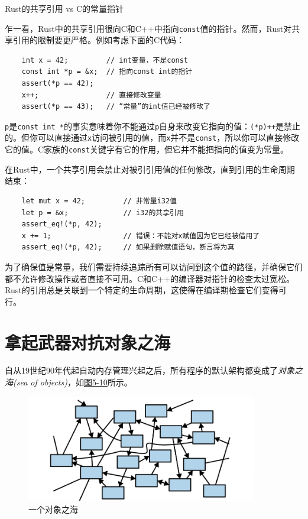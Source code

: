 \begin{shaded}
    \begin{center}
        \Large{Rust的共享引用 vs C的常量指针}
    \end{center}

    乍一看，Rust中的共享引用很向C和C++中指向\texttt{const}值的指针。然而，Rust对共享引用的限制要更严格。例如考虑下面的C代码：
    \begin{verbatim}
    int x = 42;         // int变量，不是const
    const int *p = &x;  // 指向const int的指针
    assert(*p == 42);
    x++;                // 直接修改变量
    assert(*p == 43);   // “常量”的int值已经被修改了
    \end{verbatim}

    \texttt{p}是\texttt{const int *}的事实意味着你不能通过\texttt{p}自身来改变它指向的值：\texttt{(*p)++}是禁止的。但你可以直接通过\texttt{x}访问被引用的值，而\texttt{x}并不是\texttt{const}，所以你可以直接修改它的值。C家族的\texttt{const}关键字有它的作用，但它并不能把指向的值变为常量。

    在Rust中，一个共享引用会禁止对被引引用值的任何修改，直到引用的生命周期结束：
    \begin{verbatim}
    let mut x = 42;         // 非常量i32值
    let p = &x;             // i32的共享引用
    assert_eq!(*p, 42);
    x += 1;                 // 错误：不能对x赋值因为它已经被借用了
    assert_eq!(*p, 42);     // 如果删除赋值语句，断言将为真
    \end{verbatim}

    为了确保值是常量，我们需要持续追踪所有可以访问到这个值的路径，并确保它们都不允许修改操作或者直接不可用。C和C++的编译器对指针的检查太过宽松。Rust的引用总是关联到一个特定的生命周期，这使得在编译期检查它们变得可行。
\end{shaded}    

\clearpage

\section{拿起武器对抗对象之海}

自从19世纪90年代起自动内存管理兴起之后，所有程序的默认架构都变成了\emph{对象之海(sea of objects)}，如\hyperref[f5-10]{图5-10}所示。

\begin{figure}[htbp]
    \centering
    \includegraphics[width=0.9\textwidth]{../img/f5-10.png}
    \caption{一个对象之海}
    \label{f5-10}
\end{figure}

